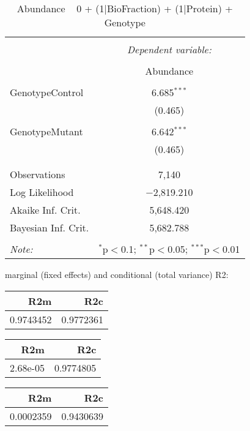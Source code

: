 \documentclass[11pt]{report}
\begin{document}
\begin{table}[!htbp] \centering 
  \caption{Abundance ~ 0 + (1|BioFraction) + (1|Protein) + Genotype} 
  \label{} 
\begin{tabular}{@{\extracolsep{5pt}}lc} 
\\[-1.8ex]\hline 
\hline \\[-1.8ex] 
 & \multicolumn{1}{c}{\textit{Dependent variable:}} \\ 
\cline{2-2} 
\\[-1.8ex] & Abundance \\ 
\hline \\[-1.8ex] 
 GenotypeControl & 6.685$^{***}$ \\ 
  & (0.465) \\ 
  & \\ 
 GenotypeMutant & 6.642$^{***}$ \\ 
  & (0.465) \\ 
  & \\ 
\hline \\[-1.8ex] 
Observations & 7,140 \\ 
Log Likelihood & $-$2,819.210 \\ 
Akaike Inf. Crit. & 5,648.420 \\ 
Bayesian Inf. Crit. & 5,682.788 \\ 
\hline 
\hline \\[-1.8ex] 
\textit{Note:}  & \multicolumn{1}{r}{$^{*}$p$<$0.1; $^{**}$p$<$0.05; $^{***}$p$<$0.01} \\ 
\end{tabular} 
\end{table} 
marginal (fixed effects) and conditional (total variance) R2:

\begin{tabular}{r|r}
\hline
R2m & R2c\\
\hline
0.9743452 & 0.9772361\\
\hline
\end{tabular}

\begin{tabular}{r|r}
\hline
R2m & R2c\\
\hline
2.68e-05 & 0.9774805\\
\hline
\end{tabular}

\begin{tabular}{r|r}
\hline
R2m & R2c\\
\hline
0.0002359 & 0.9430639\\
\hline
\end{tabular}
\end{document}

